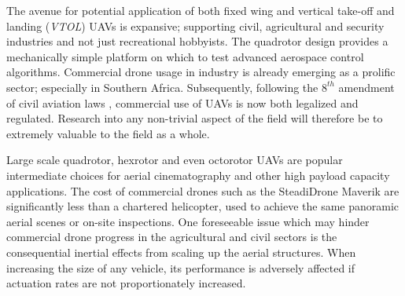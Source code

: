 \par
The avenue for potential application of both fixed wing and vertical take-off and landing (\emph{VTOL}) UAVs is expansive; supporting civil\cite{civilquadcopter}, agricultural\cite{agriculturequadcopter} and security\cite{videosurveillancequadcopter} industries and not just recreational hobbyists. The quadrotor design provides a mechanically simple platform on which to test advanced aerospace control algorithms. Commercial drone usage in industry is already emerging as a prolific sector; especially in Southern Africa. Subsequently, following the $8^{th}$ amendment of civil aviation laws \cite{dronelaw}, commercial use of UAVs is now both legalized and regulated. Research into any non-trivial aspect of the field will therefore be to extremely valuable to the field as a whole. 
\par
Large scale quadrotor, hexrotor and even octorotor UAVs are popular intermediate choices for aerial cinematography and other high payload capacity applications. The cost of commercial drones such as the SteadiDrone Maverik \cite{steadidrone} are significantly less than a chartered helicopter, used to achieve the same panoramic aerial scenes or on-site inspections. One foreseeable issue which may hinder commercial drone progress in the agricultural and civil sectors is the consequential inertial effects from scaling up the aerial structures. When increasing the size of any vehicle, its performance is adversely affected if actuation rates are not proportionately increased.
